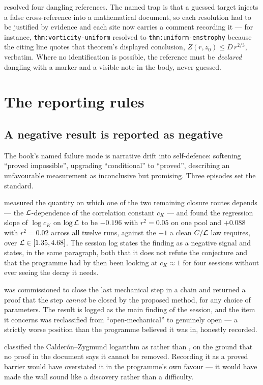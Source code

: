  resolved four dangling references. The named trap is that a guessed
target injects a false cross-reference into a mathematical document, so each
resolution had to be justified by evidence and each site now carries a comment
recording it --- for instance, \texttt{thm:vorticity-uniform} resolved to
\texttt{thm:uniform-enstrophy} because the citing line quotes that theorem's
displayed conclusion, \(Z(r,z_0)\le D\,r^{2/3}\), verbatim. Where no
identification is possible, the reference must be \emph{declared} dangling
with a marker and a visible note in the body, never guessed.

\section{The reporting rules}
\label{sec:reporting-rules}

\subsection{A negative result is reported as negative}

The book's named failure mode is narrative drift into self-defence: softening
``proved impossible'', upgrading ``conditional'' to ``proved'', describing an
unfavourable measurement as inconclusive but promising. Three episodes set
the standard.

 measured the quantity on which one of the two remaining closure routes
depends --- the \(\mathcal{L}\)-dependence of the correlation constant \(c_K\) ---
and found the regression slope of \(\log c_K\) on \(\log\mathcal{L}\) to be
\(-0.196\) with \(r^2=0.05\) on one pool and \(+0.088\) with \(r^2=0.02\)
across all twelve runs, against the \(-1\) a clean \(C/\mathcal{L}\) law requires,
over \(\mathcal{L}\in[1.35,4.68]\). The session log states the finding as a negative
signal and states, in the same paragraph, both that it does not refute the
conjecture and that the programme had by then been looking at \(c_K\approx1\)
for four sessions without ever seeing the decay it needs.

 was commissioned to close the last mechanical step in a chain and
returned a proof that the step \emph{cannot} be closed by the proposed method,
for any choice of parameters. The result is logged as the main finding of the
session, and the item it concerns was reclassified from ``open-mechanical'' to
genuinely open --- a strictly worse position than the programme believed it
was in, honestly recorded.

 classified the Calder\'on--Zygmund logarithm as \OPEN{} rather than
\IMPOSSIBLE{}, on the ground that no proof in the document says it cannot be
removed. Recording it as a proved barrier would have overstated it in the
programme's own favour --- it would have made the wall sound like a discovery
rather than a difficulty.

